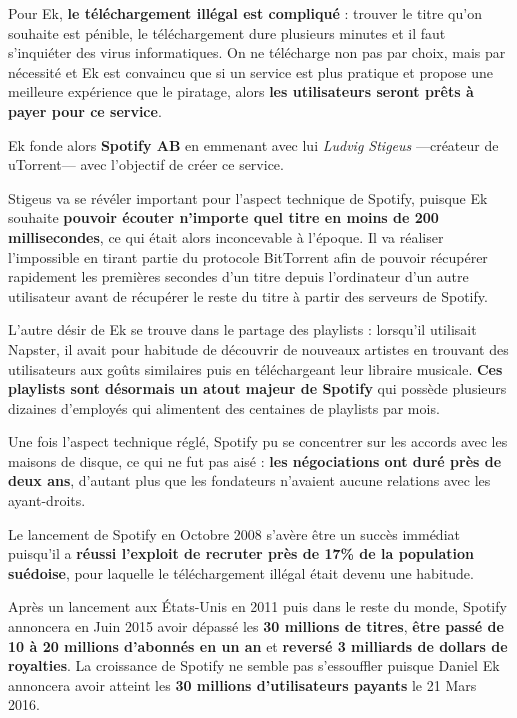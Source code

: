 Pour Ek, \textbf{le téléchargement illégal est compliqué} : trouver le titre qu'on souhaite est pénible, le téléchargement dure plusieurs minutes et il faut s'inquiéter des virus informatiques. On ne télécharge non pas par choix, mais par nécessité et Ek est convaincu que si un service est plus pratique et propose une meilleure expérience que le piratage, alors \textbf{les utilisateurs seront prêts à payer pour ce service}.

\vspace{5mm}

Ek fonde alors \textbf{Spotify AB} en emmenant avec lui \textit{Ludvig Stigeus} ---créateur de uTorrent--- avec l'objectif de créer ce service.

Stigeus va se révéler important pour l'aspect technique de Spotify, puisque Ek souhaite \textbf{pouvoir écouter n'importe quel titre en moins de 200 millisecondes}, ce qui était alors inconcevable à l'époque. Il va réaliser l'impossible en tirant partie du protocole BitTorrent afin de pouvoir récupérer rapidement les premières secondes d'un titre depuis l'ordinateur d'un autre utilisateur avant de récupérer le reste du titre à partir des serveurs de Spotify.

L'autre désir de Ek se trouve dans le partage des playlists : lorsqu'il utilisait Napster, il avait pour habitude de découvrir de nouveaux artistes en trouvant des utilisateurs aux goûts similaires puis en téléchargeant leur libraire musicale. \textbf{Ces playlists sont désormais un atout majeur de Spotify} qui possède plusieurs dizaines d'employés qui alimentent des centaines de playlists par mois.

Une fois l'aspect technique réglé, Spotify pu se concentrer sur les accords avec les maisons de disque, ce qui ne fut pas aisé : \textbf{les négociations ont duré près de deux ans}, d'autant plus que les fondateurs n'avaient aucune relations avec les ayant-droits.

\vspace{5mm}

Le lancement de Spotify en Octobre 2008 s'avère être un succès immédiat puisqu'il a \textbf{réussi l'exploit de  recruter près de 17\% de la population suédoise}\supercite{IFPIDRM2010}, pour laquelle le téléchargement illégal était devenu une habitude.

Après un lancement aux États-Unis en 2011 puis dans le reste du monde, Spotify annoncera en Juin 2015 avoir dépassé les \textbf{30 millions de titres}\supercite{SpotifyPSMusic},  \textbf{être passé de 10 à 20 millions d'abonnés en un an} et \textbf{reversé 3 milliards de dollars de royalties}\supercite{Spotify20Million}. La croissance de Spotify ne semble pas s'essouffler puisque Daniel Ek annoncera avoir atteint les \textbf{30 millions d'utilisateurs payants} le 21 Mars 2016\supercite{Spotify30Million}.


